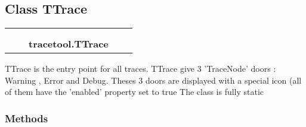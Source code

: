 

\subsection{Class TTrace}

    \label{tracetool:TTrace}
\begin{tabular}{cccccc}
\multicolumn{2}{r}{\settowidth{\BCL}{object}\multirow{2}{\BCL}{object}}
&&
  \\\cline{3-3}
  &&\multicolumn{1}{c|}{}
&&
  \\
&&\multicolumn{2}{l}{\textbf{tracetool.TTrace}}
\end{tabular}

TTrace is the entry point for all traces. TTrace give 3 'TraceNode' doors :
Warning , Error and Debug. Theses 3 doors are displayed with a special icon
(all of them have the 'enabled' property set to true The class is fully 
static



  \subsubsection{Methods}

    \label{tracetool:TTrace:show}

    \vspace{0.5ex}

